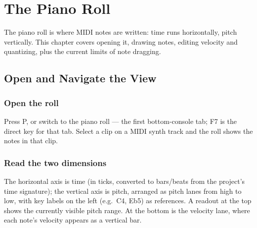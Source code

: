 
\chapter{The Piano Roll}
\label{ch:piano-roll}






The piano roll is where MIDI notes are written: time runs horizontally, pitch
vertically. This chapter covers opening it, drawing notes, editing velocity and
quantizing, plus the current limits of note dragging.

\section{Open and Navigate the View}

\subsection{Open the roll}

Press P, or switch to the piano roll — the first bottom-console tab; F7 is the direct
key for that tab. Select a clip on a MIDI synth track and the roll shows the notes in
that clip.

\subsection{Read the two dimensions}

The horizontal axis is time (in ticks, converted to bars/beats from the project's time
signature); the vertical axis is pitch, arranged as pitch lanes from high to low, with
key labels on the left (e.g.\ C4, Eb5) as references. A readout at the top shows the
currently visible pitch range. At the bottom is the velocity lane, where each note's
velocity appears as a vertical bar.


